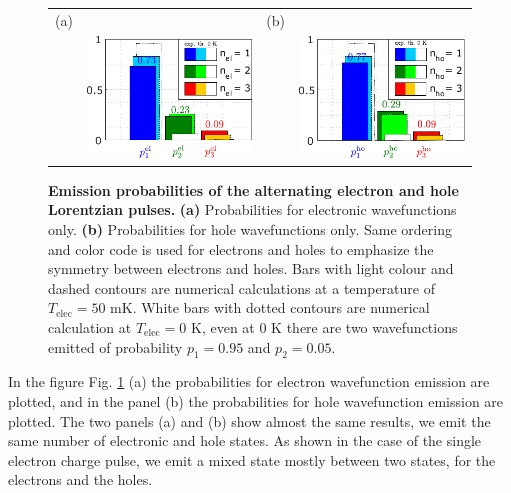 \begin{figure}[hptb]
	\begin{center}
		\begin{tabular}{c c c c}
			
			(a) & & (b) &  \\ 
			& \includegraphics[width = 5 cm]{./chap1/JnlAC_Data_leviton_40ps_1e_JMAP_f_vf_proba_el} &
			& \includegraphics[width = 5 cm]{./chap1/JnlAC_Data_leviton_40ps_1e_JMAP_f_vf_proba_ho} 
		\end{tabular} 
	\end{center}
	\caption{\textbf{Emission probabilities of the alternating electron and hole Lorentzian pulses.} \textbf{(a)} Probabilities for electronic wavefunctions only. \textbf{(b)} Probabilities for hole wavefunctions only. Same ordering and color code is used for electrons and holes to emphasize the symmetry between electrons and holes. Bars with light colour and dashed contours are numerical calculations at a temperature of $T_{\mathrm{elec}} = 50$ mK. White bars with dotted contours are numerical calculation at $T_{\mathrm{elec}} = 0$ K, even at 0 K there are two wavefunctions emitted of probability $p_{1} = 0.95$ and $p_{2} = 0.05$.}
	\label{fig: pi du 1e 40ps AC}
\end{figure}

In the figure Fig. \ref{fig: pi du 1e 40ps AC} (a) the probabilities for electron wavefunction emission are plotted, and in the panel (b) the probabilities for hole wavefunction emission are plotted.
The two panels (a) and (b) show almost the same results, we emit the same number of electronic and hole states.
As shown in the case of the single electron charge pulse, we emit a mixed state mostly between two states, for the electrons and the holes.


